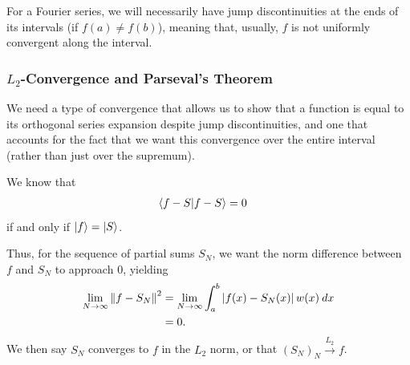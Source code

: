 \documentclass[10pt]{mypackage}
\begin{document}
For a Fourier series, we will necessarily have jump discontinuities at the ends of its intervals (if $f(a) \neq f(b)$), meaning that, usually, $f$ is not uniformly convergent along the interval.
\subsubsection{$L_2$-Convergence and Parseval's Theorem}%
We need a type of convergence that allows us to show that a function is equal to its orthogonal series expansion despite jump discontinuities, and one that accounts for the fact that we want this convergence over the entire interval (rather than just over the supremum).\newline

We know that
\begin{align*}
  \braket{f-S}{f-S} &= 0
\end{align*}
if and only if $\ket{f} = \ket{S}$.\newline

Thus, for the sequence of partial sums $S_N$, we want the norm difference between $f$ and $S_N$ to approach $0$, yielding
\begin{align*}
  \lim_{N\rightarrow\infty}\norm{f- S_N}^2 &= \lim_{N\rightarrow\infty}\int_{a}^{b} \left\vert f(x)-S_N(x) \right\vert w(x)\:dx\\
                            &= 0.
\end{align*}
We then say $S_N$ converges to $f$ in the $L_2$ norm, or that $\left(S_N\right)_N\xrightarrow{L_2} f$.\newline
\end{document}
